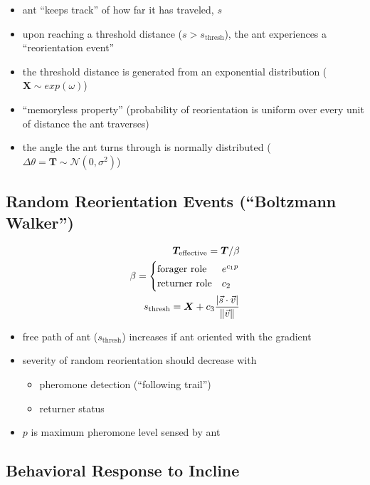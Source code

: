\begin{itemize}
		\item ant ``keeps track'' of how far it has traveled, $s$
    \item upon reaching a threshold distance ($s > s_{\operatorname{thresh}}$), the ant experiences a ``reorientation event''
    \item the threshold distance is generated from an exponential distribution ($\bm{X} \sim \mathit{exp}(\omega)$)
    \item ``memoryless property'' (probability of reorientation is uniform over every unit of distance the ant traverses)
    \item the angle the ant turns through is normally distributed  ($\Delta \theta = \bm{T} \sim \mathcal{N}(0,\sigma^2)$)
\end{itemize}

\subsection{Random Reorientation Events (``Boltzmann Walker'')}
\begin{align*}
\bm{T}_{\operatorname{effective}} = \bm{T} / \beta \\
\beta =
\begin{cases}
      \text{forager role} & e^{c_1p} \\
      \text{returner role} & c_2
\end{cases} \\
s_{\operatorname{thresh}} = \bm{X} + c_3 \frac{|\vec{s} \cdot \vec{v}|}{\lVert\vec{v}\rVert}
\end{align*}

\begin{itemize}
  \item free path of ant ($s_{\operatorname{thresh}}$) increases if ant oriented with the gradient {\scriptsize\cite{khuong_how_2013}}
	\item severity of random reorientation should decrease with
    \begin{itemize}
    	\item pheromone detection (``following trail'')
      \item returner status
    \end{itemize}
    \item $p$ is maximum pheromone level sensed by ant
\end{itemize}

\subsection{Behavioral Response to Incline}

